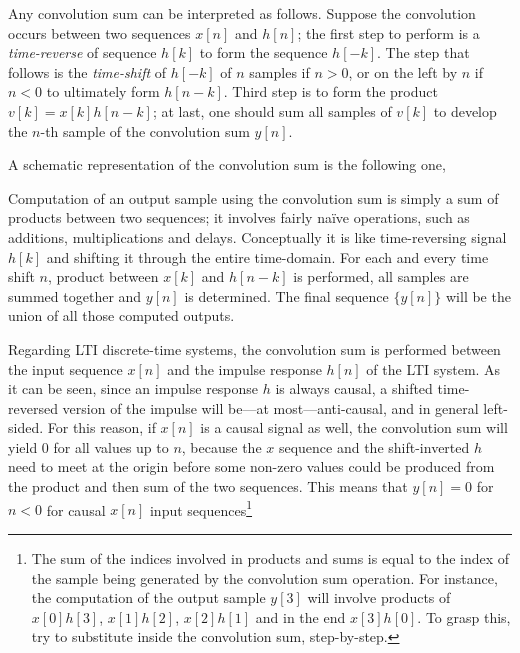 \documentclass[\documentfontsize, twocolumn]{\classname}
\begin{document}
Any convolution sum can be interpreted as follows. Suppose the convolution occurs between two sequences $x[n]$ and $h[n]$; the first step to perform is a \emph{time-reverse} of sequence $h[k]$ to form the sequence $h[-k]$. The step that follows is the \emph{time-shift} of $h[-k]$ of $n$ samples if $n > 0$, or on the left by $n$ if $n<0$ to ultimately form $h[n-k]$. Third step is to form the product $v[k] = x[k]h[n-k]$; at last, one should sum all samples of $v[k]$ to develop the $n$-th sample of the convolution sum $y[n]$.

A schematic representation of the convolution sum is the following one,
\begin{center}
\end{center}

Computation of an output sample using the convolution sum is simply a sum of products between two sequences; it involves fairly na\"ive operations, such as additions, multiplications and delays. Conceptually it is like time-reversing signal $h[k]$ and shifting it through the entire time-domain. For each and every time shift $n$, product between $x[k]$ and $h[n-k]$ is performed, all samples are summed together and $y[n]$ is determined. The final sequence $\{y[n]\}$ will be the union of all those computed outputs.

Regarding LTI discrete-time systems, the convolution sum is performed between the input sequence $x[n]$ and the impulse response $h[n]$ of the LTI system. As it can be seen, since an impulse response $h$ is always causal, a shifted time-reversed version of the impulse will be---at most---anti-causal, and in general left-sided. For this reason, if $x[n]$ is a causal signal as well, the convolution sum will yield $0$ for all values up to $n$, because the $x$ sequence and the shift-inverted $h$ need to meet at the origin before some non-zero values could be produced from the product and then sum of the two sequences. This means that $y[n]=0$ for $n<0$ for causal $x[n]$ input sequences\footnote{The sum of the indices involved in products and sums is equal to the index of the sample being generated by the convolution sum operation. For instance, the computation of the output sample $y[3]$ will involve products of $x[0]h[3]$, $x[1]h[2]$, $x[2]h[1]$ and in the end $x[3]h[0]$. To grasp this, try to substitute inside the convolution sum, step-by-step.}
\end{document}
